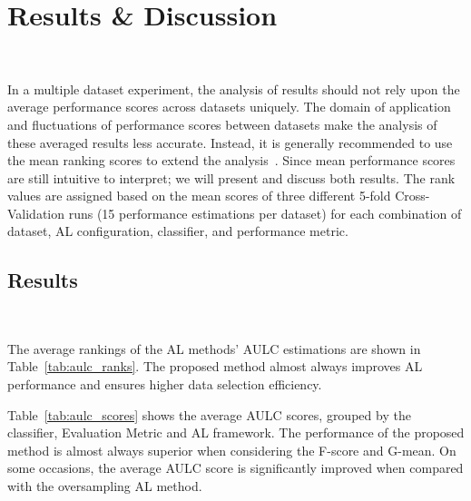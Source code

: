 \documentclass[10pt,journal,compsoc]{IEEEtran}
\begin{document}
\section{Results \& Discussion}~\label{sec:results_discussion}

In a multiple dataset experiment, the analysis of results should not rely upon
the average performance scores across datasets uniquely. The domain of
application and fluctuations of performance scores between datasets make the
analysis of these averaged results less accurate. Instead, it is generally
recommended to use the mean ranking scores to extend the
analysis~\cite{Demsar2006}. Since mean performance scores are still intuitive
to interpret; we will present and discuss both results. The rank values are
assigned based on the mean scores of three different 5-fold Cross-Validation
runs (15 performance estimations per dataset) for each combination of dataset,
AL configuration, classifier, and performance metric.
 
\subsection{Results}~\label{sec:results}

The average rankings of the AL methods' AULC estimations are shown in
Table~\ref{tab:aulc_ranks}. The proposed method almost always improves AL
performance and ensures higher data selection efficiency.
 
\begin{table}
	\centering
    \caption{%
        Mean rankings of the AULC metric over the different datasets (15),
        folds (5), and runs (3) used in the experiment. The proposed method
        constantly improves the results of the original framework and, on
        average, almost always improves the results of the oversampling
        framework.
    }\label{tab:aulc_ranks}
\end{table}
 
Table~\ref{tab:aulc_scores} shows the average AULC scores, grouped by the
classifier, Evaluation Metric and AL framework. The performance of the
proposed method is almost always superior when considering the F-score and
G-mean. On some occasions, the average AULC score is significantly improved
when compared with the oversampling AL method.
\end{document}
